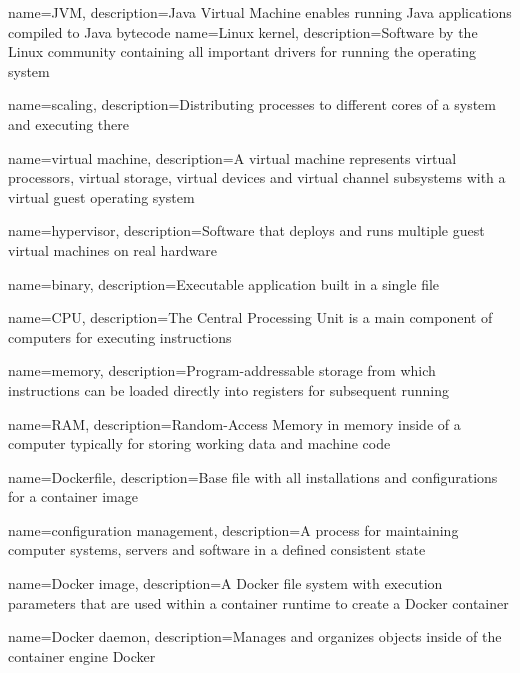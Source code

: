 {
    name={JVM},
    description={Java Virtual Machine enables running Java applications compiled to Java bytecode}
}
{
    name={Linux kernel},
    description={Software by the Linux community containing all important drivers for running the operating system}
}

{
    name={scaling},
    description={Distributing processes to different cores of a system and executing there}
}

{
    name={virtual machine},
    description={A virtual machine represents virtual processors, virtual storage, virtual devices and virtual channel subsystems with a virtual guest operating system}
}

{
    name={hypervisor},
    description={Software that deploys and runs multiple guest virtual machines on real hardware}
}


{
    name={binary},
    description={Executable application built in a single file}
}

{
    name={CPU},
    description={The Central Processing Unit is a main component of computers for executing instructions}
}

{
    name={memory},
    description={Program-addressable storage from which instructions can be loaded directly into registers for subsequent running}
}

{
    name={RAM},
    description={Random-Access Memory in memory inside of a computer typically for storing working data and machine code}
}

{
    name={Dockerfile},
    description={Base file with all installations and configurations for a container image}
}

{
    name={configuration management},
    description={A process for maintaining computer systems, servers and software in a defined consistent state}
}

{
    name={Docker image},
    description={A Docker file system with execution parameters that are used within a container runtime to create a Docker container}
}

{
    name={Docker daemon},
    description={Manages and organizes objects inside of the container engine Docker}
}

